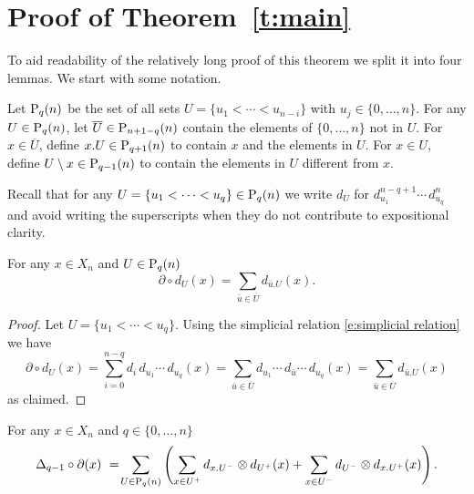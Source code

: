 
\section{Proof of Theorem~\ref{t:main}} \label{s:proof}

To aid readability of the relatively long proof of this theorem we split it into four lemmas.
We start with some notation.

\begin{definition}
	Let $\P_q(n)$ be the set of all sets $U = \{u_1 < \cdots < u_{n-i}\}$ with $u_j \in \{0, \dots, n\}$.
	For any $U \in \P_q(n)$, let $\overline{U} \in \P_{n+1-q}(n)$ contain the elements of $\{0, \dots, n\}$ not in $U$. For $x \in \overline{U}$, define $x.U \in \P_{q+1}(n)$ to contain $x$ and the elements in $U$.
	For $x \in U$, define $U \setminus x \in \P_{q-1}(n)$ to contain the elements in $U$ different from $x$.
\end{definition}

Recall that for any $U = \{u_1 < \cdots < u_q\} \in \P_q(n)$ we write $d_U$ for $d_{u_1}^{n-q+1} \cdots \,d_{u_q}^n$ and avoid writing the superscripts when they do not contribute to expositional clarity.

\begin{lemma} \label{l:partial dU = dxU}
	For any $x \in X_n$ and $U \in \P_{q}(n)$
	\begin{equation} \label{lemma1: existence: eq1}
	\partial \circ d_U(x) = \sum_{\bar{u} \in \overline{U}} d_{\bar{u}.U}(x).
	\end{equation}
\end{lemma}

\begin{proof}
	Let $U = \{u_1 < \cdots < u_q\}$. Using the simplicial relation \eqref{e:simplicial relation} we have
	\begin{equation*}
	\partial \circ d_U(x) = 
	\sum_{i=0}^{n-q} d_i\, d_{u_1} \cdots\, d_{u_q}(x) = 
	\sum_{\bar{u} \in \overline{U}} d_{u_1} \cdots\, d_{\bar{u}} \cdots\, d_{u_q}(x) =
	\sum_{\bar{u} \in \overline{U}} d_{\bar{u}.U}(x)
	\end{equation*}
	as claimed.
\end{proof}


\begin{lemma} \label{l:}
	For any $x \in X_n$ and $q \in \{0, \dots, n\}$
	\begin{equation} \label{e:pigeon hole 1}
	\Delta_{q-1} \circ \partial (x)\ =\! 
	\sum_{U \in \P_q(n)} \left( 
	\sum_{x \in U^+} d_{x.U^-} \tensor d_{U^+}(x) + 
	\sum_{x \in U^-} d_{U^-} \tensor d_{x.U^+}(x) \right).
	\end{equation}
\end{lemma}


